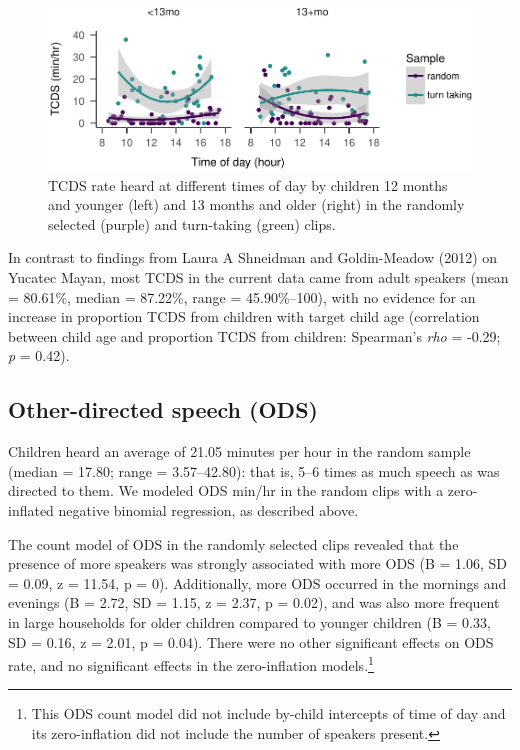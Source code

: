 \documentclass[floatsintext,man]{apa6}
\theoremstyle{definition}
\theoremstyle{definition}
\theoremstyle{definition}
\theoremstyle{remark}
\begin{document}
\begin{figure}
\centering
\includegraphics{Tseltal-CLE_files/figure-latex/fig4-1.pdf}
\caption{\label{fig:fig4}TCDS rate heard at different times of day by
children 12 months and younger (left) and 13 months and older (right) in
the randomly selected (purple) and turn-taking (green) clips.}
\end{figure}

In contrast to findings from Laura A Shneidman and Goldin-Meadow (2012)
on Yucatec Mayan, most TCDS in the current data came from adult speakers
(mean = 80.61\%, median = 87.22\%, range = 45.90\%--100), with no
evidence for an increase in proportion TCDS from children with target
child age (correlation between child age and proportion TCDS from
children: Spearman's \emph{rho} = -0.29; \emph{p} = 0.42).

\subsection{Other-directed speech
(ODS)}\label{other-directed-speech-ods}

Children heard an average of 21.05 minutes per hour in the random sample
(median = 17.80; range = 3.57--42.80): that is, 5--6 times as much
speech as was directed to them. We modeled ODS min/hr in the random
clips with a zero-inflated negative binomial regression, as described
above.

The count model of ODS in the randomly selected clips revealed that the
presence of more speakers was strongly associated with more ODS (B =
1.06, SD = 0.09, z = 11.54, p = 0). Additionally, more ODS occurred in
the mornings and evenings (B = 2.72, SD = 1.15, z = 2.37, p = 0.02), and
was also more frequent in large households for older children compared
to younger children (B = 0.33, SD = 0.16, z = 2.01, p = 0.04). There
were no other significant effects on ODS rate, and no significant
effects in the zero-inflation models.\footnote{This ODS count model did
  not include by-child intercepts of time of day and its zero-inflation
  did not include the number of speakers present.}
\end{document}
